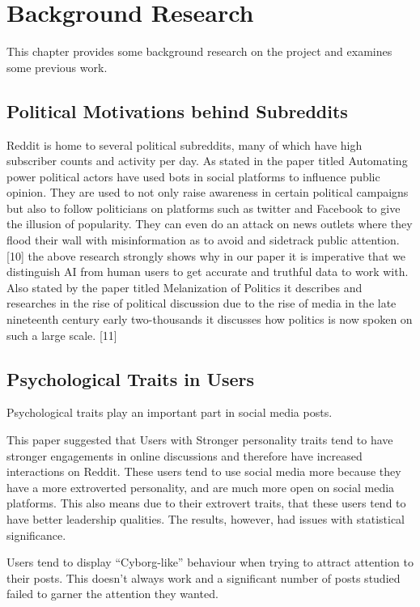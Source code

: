\chapter{Background Research}\label{ch:Background}

This chapter provides some background research on the project and examines some previous work.

\section{Political Motivations behind Subreddits}
Reddit is home to several political subreddits, many of which have high subscriber counts and activity per day. As stated in the paper titled Automating power political actors have used bots in social platforms to influence public opinion. They are used to not only raise awareness in certain political campaigns but also to follow politicians on platforms such as twitter and Facebook to give the illusion of popularity. They can even do an attack on news outlets where they flood their wall with misinformation as to avoid and sidetrack public attention. [10] the above research strongly shows why in our paper it is imperative that we distinguish AI from human users to get accurate and truthful data to work with. Also stated by the paper titled Melanization of Politics it describes and researches in the rise of political discussion due to the rise of media in the late nineteenth century early two-thousands it discusses how politics is now spoken on such a large scale. [11]

\section{Psychological Traits in Users}
Psychological traits play an important part in social media posts.

This paper \cite{kilgo_ng_riedl_lacasa-mas_2018} suggested that Users with Stronger personality traits tend to have stronger engagements in online discussions and therefore have increased interactions on Reddit. These users tend to use social media more because they have a more extroverted personality, and are much more open on social media platforms. This also means due to their extrovert traits, that these users tend to have better leadership qualities. The results, however, had issues with statistical significance.

Users tend to display “Cyborg-like” behaviour when trying to attract attention to their posts. This doesn’t always work and a significant number of posts studied \cite{7} failed to garner the attention they wanted. 

